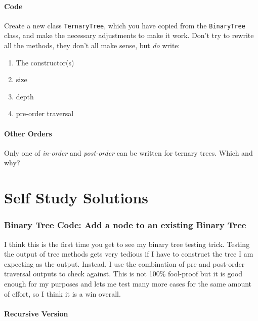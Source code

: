 \documentclass[twoside=false,DIV=14]{scrartcl}
\begin{document}
\subsection{Code}
Create a new class \verb|TernaryTree|, which you have copied from the \verb|BinaryTree| class, and make the necessary adjustments to make it work.  Don't try to rewrite all the methods, they don't all make sense, but \emph{do} write:
\begin{enumerate}
\item The constructor(s)
\item size
\item depth
\item  pre-order traversal
\end{enumerate}

\subsection{Other Orders}
Only one of \emph{in-order} and \emph{post-order} can be written for ternary trees.  Which and why?

\newpage\setcounter{section}{0}
\part*{Self Study Solutions}

\section{Binary Tree Code: Add a node to an existing Binary Tree}
I think this is the first time you get to see my binary tree testing trick.  Testing the output of tree methods gets very tedious if I have to construct the tree I am expecting as the output.  Instead, I use the combination of pre and post-order traversal outputs to check against.  This is not 100\% fool-proof but it is good enough for my purposes and lets me test many more cases for the same amount of effort, so I think it is a win overall.

\subsection{Recursive Version}
\end{document}
